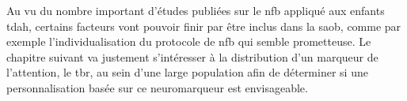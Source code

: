 Au vu du nombre important d'études publiées sur le \gls{nfb} appliqué aux enfants \gls{tdah}, certains facteurs vont pouvoir finir par être inclus dans la \gls{saob}, comme par exemple 
l'individualisation du protocole de \gls{nfb} qui semble prometteuse. Le chapitre suivant va justement s'intéresser à la distribution d'un marqueur de l'attention, 
le \gls{tbr}, au sein d'une large population afin de déterminer si une personnalisation basée sur ce neuromarqueur est envisageable.




 